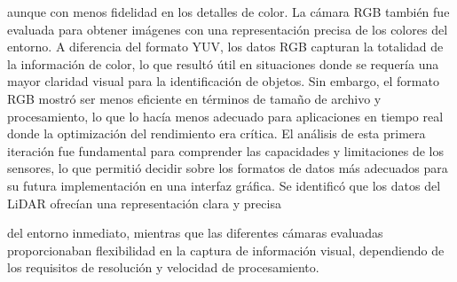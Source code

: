         aunque con menos fidelidad en los detalles de color.
    \vskip 0.5cm
    La c\'amara RGB tambi\'en fue evaluada para obtener im\'agenes con una representaci\'on precisa de los colores del 
        entorno. A diferencia del formato YUV, los datos RGB capturan la totalidad de la informaci\'on de color, 
        lo que result\'o \'util en situaciones donde se requer\'ia una mayor claridad visual para la identificaci\'on 
        de objetos. Sin embargo, el formato RGB mostr\'o ser menos eficiente en t\'erminos de tama\~no de archivo y 
        procesamiento, lo que lo hac\'ia menos adecuado para aplicaciones en tiempo real donde la optimizaci\'on 
        del rendimiento era cr\'itica.
    \vskip 0.5cm
    El an\'alisis de esta primera iteraci\'on fue fundamental para comprender las capacidades y limitaciones de los 
        sensores, lo que permiti\'o decidir sobre los formatos de datos m\'as adecuados para su futura implementaci\'on 
        en una interfaz gr\'afica. Se identific\'o que los datos del LiDAR ofrec\'ian una representaci\'on clara y precisa 

        del entorno inmediato, mientras que las diferentes c\'amaras evaluadas proporcionaban flexibilidad en la 
        captura de informaci\'on visual, dependiendo de los requisitos de resoluci\'on y velocidad de procesamiento.
